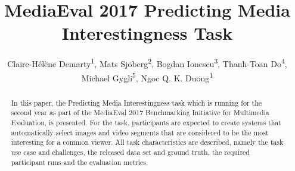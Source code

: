 \documentclass[sigconf]{acmart-me}
\begin{document}
\title{MediaEval 2017 Predicting Media Interestingness Task}



%
\author{Claire-H\'{e}l\`{e}ne Demarty\textsuperscript{1}, Mats Sj\"{o}berg\textsuperscript{2}, Bogdan Ionescu\textsuperscript{3}, Thanh-Toan Do\textsuperscript{4}, \\ Michael Gygli\textsuperscript{5}, Ngoc Q. K. Duong\textsuperscript{1}}



\renewcommand{\shortauthors}{C.H. Demarty et al.}


\begin{abstract}
In this paper, the Predicting Media Interestingness task which is running for the 
second year as part of the Media\-Eval 2017 Benchmarking Initiative for Multimedia Evaluation,
is presented. For the task, participants are expected to create systems that automatically
select images and video segments that are considered to be the most
interesting for a common viewer. All task characteristics are described, namely
the task use case and challenges, the released data set and ground truth, the required
participant runs and the evaluation metrics.
\end{abstract}
\end{document}
